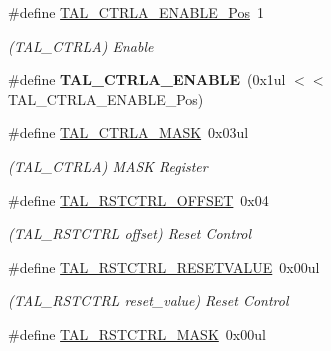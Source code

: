 \begin{DoxyCompactItemize}
\item 
\hypertarget{group___s_a_m_l21___t_a_l_ga4ed31e67a3c6f0dbecc22d0474f2afdc}{}\#define \hyperlink{group___s_a_m_l21___t_a_l_ga4ed31e67a3c6f0dbecc22d0474f2afdc}{T\+A\+L\+\_\+\+C\+T\+R\+L\+A\+\_\+\+E\+N\+A\+B\+L\+E\+\_\+\+Pos}~1\label{group___s_a_m_l21___t_a_l_ga4ed31e67a3c6f0dbecc22d0474f2afdc}

\begin{DoxyCompactList}\small\item\em (T\+A\+L\+\_\+\+C\+T\+R\+L\+A) Enable \end{DoxyCompactList}\item 
\hypertarget{group___s_a_m_l21___t_a_l_ga8034b12c6051c5000ce7f1b5ddf7ec32}{}\#define {\bfseries T\+A\+L\+\_\+\+C\+T\+R\+L\+A\+\_\+\+E\+N\+A\+B\+L\+E}~(0x1ul $<$$<$ T\+A\+L\+\_\+\+C\+T\+R\+L\+A\+\_\+\+E\+N\+A\+B\+L\+E\+\_\+\+Pos)\label{group___s_a_m_l21___t_a_l_ga8034b12c6051c5000ce7f1b5ddf7ec32}

\item 
\hypertarget{group___s_a_m_l21___t_a_l_ga3a88fde984d517e7ecf70e37939c0149}{}\#define \hyperlink{group___s_a_m_l21___t_a_l_ga3a88fde984d517e7ecf70e37939c0149}{T\+A\+L\+\_\+\+C\+T\+R\+L\+A\+\_\+\+M\+A\+S\+K}~0x03ul\label{group___s_a_m_l21___t_a_l_ga3a88fde984d517e7ecf70e37939c0149}

\begin{DoxyCompactList}\small\item\em (T\+A\+L\+\_\+\+C\+T\+R\+L\+A) M\+A\+S\+K Register \end{DoxyCompactList}\item 
\hypertarget{group___s_a_m_l21___t_a_l_gaaed821c676de6e9726350826d3ba3a9b}{}\#define \hyperlink{group___s_a_m_l21___t_a_l_gaaed821c676de6e9726350826d3ba3a9b}{T\+A\+L\+\_\+\+R\+S\+T\+C\+T\+R\+L\+\_\+\+O\+F\+F\+S\+E\+T}~0x04\label{group___s_a_m_l21___t_a_l_gaaed821c676de6e9726350826d3ba3a9b}

\begin{DoxyCompactList}\small\item\em (T\+A\+L\+\_\+\+R\+S\+T\+C\+T\+R\+L offset) Reset Control \end{DoxyCompactList}\item 
\hypertarget{group___s_a_m_l21___t_a_l_ga07cb2c0d25ca13b2aa84b669ede2c252}{}\#define \hyperlink{group___s_a_m_l21___t_a_l_ga07cb2c0d25ca13b2aa84b669ede2c252}{T\+A\+L\+\_\+\+R\+S\+T\+C\+T\+R\+L\+\_\+\+R\+E\+S\+E\+T\+V\+A\+L\+U\+E}~0x00ul\label{group___s_a_m_l21___t_a_l_ga07cb2c0d25ca13b2aa84b669ede2c252}

\begin{DoxyCompactList}\small\item\em (T\+A\+L\+\_\+\+R\+S\+T\+C\+T\+R\+L reset\+\_\+value) Reset Control \end{DoxyCompactList}\item 
\hypertarget{group___s_a_m_l21___t_a_l_ga36fa5c8d315e15fdd1ed19348ca261c5}{}\#define \hyperlink{group___s_a_m_l21___t_a_l_ga36fa5c8d315e15fdd1ed19348ca261c5}{T\+A\+L\+\_\+\+R\+S\+T\+C\+T\+R\+L\+\_\+\+M\+A\+S\+K}~0x00ul\label{group___s_a_m_l21___t_a_l_ga36fa5c8d315e15fdd1ed19348ca261c5}


\end{DoxyCompactItemize}
